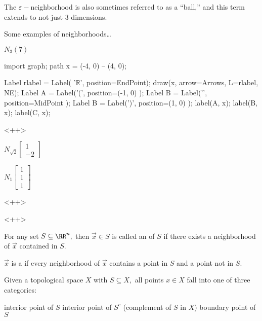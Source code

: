 \documentclass{article}
\begin{document}
The $\varepsilon-$neighborhood is also sometimes referred to as a ``ball,'' and this term extends to not just 3 dimensions.

\begin{example}
	Some examples of neighborhoods\ldots
	\begin{itemize}
		\ii $N_3(7)$
		\begin{center}
			\begin{asy}
				import graph;
				path x = (-4, 0) -- (4, 0);

				Label rlabel = Label( '$\mathbb{R}$', position=EndPoint);
				draw(x, arrow=Arrows, L=rlabel, NE);
				Label A = Label('(', position=(-1, 0) );
				Label B = Label('\vert', position=MidPoint );
				Label B = Label(')', position=(1, 0) );
				label(A, x);
				label(B, x);
				label(C, x);
				
			\end{asy}
		\end{center}<++>

		\ii $N_{\sqrt{2}}\begin{bmatrix}
			1 \\ -2
		\end{bmatrix}$

		\ii $N_1\begin{bmatrix}
			1 \\ 1 \\ 1
		\end{bmatrix}$
	\end{itemize}<++>
\end{example}<++>

\begin{definition}
	For any set $S\subseteq \RR^n,$ then $\vec{x}\in S$ is called an  of $S$ if there exists a neighborhood of $\vec{x}$ contained in $S.$
\end{definition}

\begin{definition}
	$\vec{x}$ is a  if every neighborhood of $\vec{x}$ contains a point in $S$ and a point not in $S.$
\end{definition}

Given a topological space $X$ with $S\subseteq X,$ all points $x\in X$ fall into one of three categories:
\begin{enumerate}
	\ii interior point of $S$
	\ii interior point of $S^c$ (complement of $S$ in $X$)
	\ii boundary point of $S$
\end{enumerate}
\end{document}
